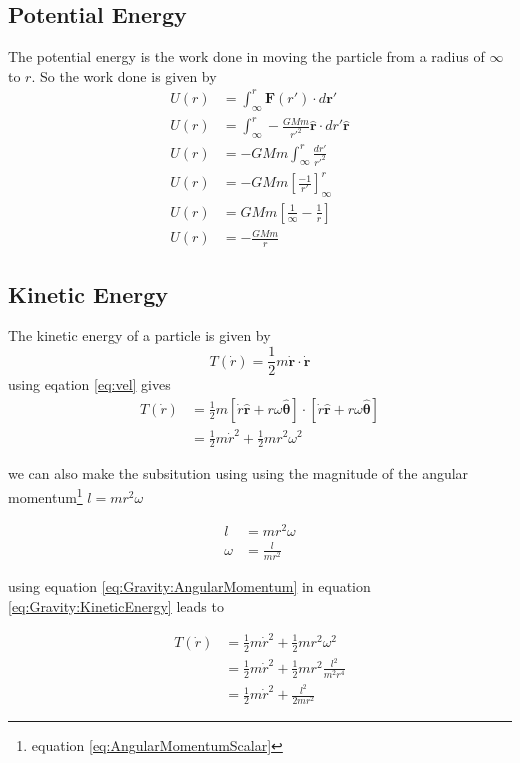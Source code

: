 \subsection{Potential Energy}
The potential energy is the work done in moving the particle from a radius of $\infty$ to $r$.
So the work done is given by
\begin{align}
U(r)&=\int_{\infty}^{r} \bm{F}(r') \cdot d\bm{r}'  \nonumber \\
U(r)&=\int_{\infty}^{r} -\frac{GMm}{r'^2} \hat{\bm{r}} \cdot dr' \hat{\bm{r}}  \nonumber \\
U(r)&=-GMm\int_{\infty}^{r} \frac{dr'}{r'^2} \nonumber \\
U(r)&=-GMm \left[ \frac{-1}{r'} \right]_{\infty}^{r} \nonumber \\
U(r)&=GMm \left[ \frac{1}{\infty} - \frac{1}{r} \right] \nonumber \\
U(r)&=- \frac{GMm}{r} \label{eq:potentialEnergy}
\end{align}

\subsection{Kinetic Energy}
The kinetic energy of a particle is given by
\begin{equation}
T(\dot{r})=\frac{1}{2}m\dot{\bm{r}}\cdot\dot{\bm{r}} \label{eq:KineticEnergy}
\end{equation}
using eqation \ref{eq:vel} gives 
\begin{align}
T(\dot{r})&=\frac{1}{2}m\left[ \dot{r}\hat{\bm{r}}+r\omega\hat{\bm{\theta}}\right]\cdot\left[ \dot{r}\hat{\bm{r}}+r\omega\hat{\bm{\theta}}\right] \nonumber \\
&=\frac{1}{2}m \dot{r}^2 + \frac{1}{2}mr^2 \omega^2 \label{eq:Gravity:KineticEnergy}
\end{align}

we can also make the subsitution using using the magnitude of the angular momentum\footnote{equation \ref{eq:AngularMomentumScalar}} $l=mr^2\omega$

\begin{align}
l&=mr^2\omega \nonumber \\
\omega&=\frac{l}{mr^2} \label{eq:Gravity:AngularMomentum}
\end{align}

using equation \ref{eq:Gravity:AngularMomentum} in equation \ref{eq:Gravity:KineticEnergy} leads to

\begin{align}
T(\dot{r})&=\frac{1}{2}m \dot{r}^2 + \frac{1}{2}mr^2 \omega^2 \nonumber \\
&=\frac{1}{2}m \dot{r}^2 + \frac{1}{2}mr^2 \frac{l^2}{m^2r^4} \nonumber \\
&=\frac{1}{2}m \dot{r}^2 + \frac{l^2}{2mr^2} \label{eq:Gravity:KineticEnergyFinal}
\end{align}

